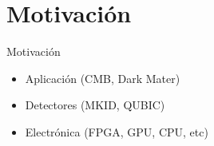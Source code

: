 \documentclass[ignorenonframetext,12pt]{beamer}
\begin{document}
\section{Motivación}
\begin{frame}{Motivación}
	\begin{itemize}
		\item Aplicación (CMB, Dark Mater)
		\item Detectores (MKID, QUBIC)
		\item Electrónica (FPGA, GPU, CPU, etc)
	\end{itemize}


\end{frame}
\end{document}
